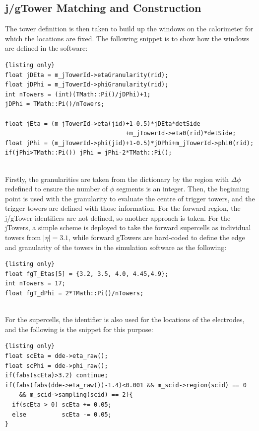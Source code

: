\subsection{j/gTower Matching and Construction}
The tower definition is then taken to build up the windows on the calorimeter for which the locations are fixed. The following snippet is to show how the windows are defined in the software:
\\
\begin{lstlisting}{listing only}
float jDEta = m_jTowerId->etaGranularity(rid);
float jDPhi = m_jTowerId->phiGranularity(rid);
int nTowers = (int)(TMath::Pi()/jDPhi)+1;
jDPhi = TMath::Pi()/nTowers;

float jEta = (m_jTowerId->eta(jid)+1-0.5)*jDEta*detSide
                                  +m_jTowerId->eta0(rid)*detSide;
float jPhi = (m_jTowerId->phi(jid)+1-0.5)*jDPhi+m_jTowerId->phi0(rid);
if(jPhi>TMath::Pi()) jPhi = jPhi-2*TMath::Pi(); 
\end{lstlisting}
\noindent
\\Firstly, the granularities are taken from the dictionary by the region with $\Delta\phi$ redefined to ensure the number of $\phi$ segments is an integer. Then, the beginning point is used with the granularity to evaluate the centre of trigger towers, and the trigger towers are defined with those information. For the forward region, the j/gTower identifiers are not defined, so another approach is taken. For the jTowers, a simple scheme is deployed to take the forward supercells as individual towers from $|\eta|=3.1$, while forward gTowers are hard-coded to define the edge and granularity of the towers in the simulation software as the following:
\\
\begin{lstlisting}{listing only}
float fgT_Etas[5] = {3.2, 3.5, 4.0, 4.45,4.9};
int nTowers = 17;
float fgT_dPhi = 2*TMath::Pi()/nTowers;
\end{lstlisting}
\noindent
\\For the supercells, the identifier is also used for the locations of the electrodes, and the following is the snippet for this purpose:
\\
\begin{lstlisting}{listing only}
float scEta = dde->eta_raw();
float scPhi = dde->phi_raw();
if(fabs(scEta)>3.2) continue;
if(fabs(fabs(dde->eta_raw())-1.4)<0.001 && m_scid->region(scid) == 0 
    && m_scid->sampling(scid) == 2){
  if(scEta > 0) scEta += 0.05;
  else          scEta -= 0.05;
}

\end{lstlisting}
